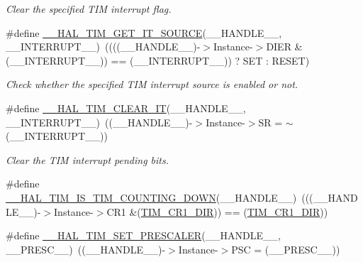 \begin{DoxyCompactItemize}
\begin{DoxyCompactList}\small\item\em Clear the specified T\+IM interrupt flag. \end{DoxyCompactList}\item 
\#define \mbox{\hyperlink{group___t_i_m___exported___macros_ga644babf93470a6eee6bce8906c4da5c5}{\+\_\+\+\_\+\+H\+A\+L\+\_\+\+T\+I\+M\+\_\+\+G\+E\+T\+\_\+\+I\+T\+\_\+\+S\+O\+U\+R\+CE}}(\+\_\+\+\_\+\+H\+A\+N\+D\+L\+E\+\_\+\+\_\+,  \+\_\+\+\_\+\+I\+N\+T\+E\+R\+R\+U\+P\+T\+\_\+\+\_\+)~((((\+\_\+\+\_\+\+H\+A\+N\+D\+L\+E\+\_\+\+\_\+)-\/$>$Instance-\/$>$D\+I\+ER \& (\+\_\+\+\_\+\+I\+N\+T\+E\+R\+R\+U\+P\+T\+\_\+\+\_\+)) == (\+\_\+\+\_\+\+I\+N\+T\+E\+R\+R\+U\+P\+T\+\_\+\+\_\+)) ? S\+ET \+: R\+E\+S\+ET)
\begin{DoxyCompactList}\small\item\em Check whether the specified T\+IM interrupt source is enabled or not. \end{DoxyCompactList}\item 
\#define \mbox{\hyperlink{group___t_i_m___exported___macros_gaea68155ce77e591e0c2582def061d6f0}{\+\_\+\+\_\+\+H\+A\+L\+\_\+\+T\+I\+M\+\_\+\+C\+L\+E\+A\+R\+\_\+\+IT}}(\+\_\+\+\_\+\+H\+A\+N\+D\+L\+E\+\_\+\+\_\+,  \+\_\+\+\_\+\+I\+N\+T\+E\+R\+R\+U\+P\+T\+\_\+\+\_\+)~((\+\_\+\+\_\+\+H\+A\+N\+D\+L\+E\+\_\+\+\_\+)-\/$>$Instance-\/$>$SR = $\sim$(\+\_\+\+\_\+\+I\+N\+T\+E\+R\+R\+U\+P\+T\+\_\+\+\_\+))
\begin{DoxyCompactList}\small\item\em Clear the T\+IM interrupt pending bits. \end{DoxyCompactList}\item 
\#define \mbox{\hyperlink{group___t_i_m___exported___macros_gac73f5e7669d92971830481e7298e98ba}{\+\_\+\+\_\+\+H\+A\+L\+\_\+\+T\+I\+M\+\_\+\+I\+S\+\_\+\+T\+I\+M\+\_\+\+C\+O\+U\+N\+T\+I\+N\+G\+\_\+\+D\+O\+WN}}(\+\_\+\+\_\+\+H\+A\+N\+D\+L\+E\+\_\+\+\_\+)~(((\+\_\+\+\_\+\+H\+A\+N\+D\+L\+E\+\_\+\+\_\+)-\/$>$Instance-\/$>$C\+R1 \&(\mbox{\hyperlink{group___peripheral___registers___bits___definition_gacea10770904af189f3aaeb97b45722aa}{T\+I\+M\+\_\+\+C\+R1\+\_\+\+D\+IR}})) == (\mbox{\hyperlink{group___peripheral___registers___bits___definition_gacea10770904af189f3aaeb97b45722aa}{T\+I\+M\+\_\+\+C\+R1\+\_\+\+D\+IR}}))
\item 
\#define \mbox{\hyperlink{group___t_i_m___exported___macros_gafdc5a06eab07e0c24e729fd492bdb27c}{\+\_\+\+\_\+\+H\+A\+L\+\_\+\+T\+I\+M\+\_\+\+S\+E\+T\+\_\+\+P\+R\+E\+S\+C\+A\+L\+ER}}(\+\_\+\+\_\+\+H\+A\+N\+D\+L\+E\+\_\+\+\_\+,  \+\_\+\+\_\+\+P\+R\+E\+S\+C\+\_\+\+\_\+)~((\+\_\+\+\_\+\+H\+A\+N\+D\+L\+E\+\_\+\+\_\+)-\/$>$Instance-\/$>$P\+SC = (\+\_\+\+\_\+\+P\+R\+E\+S\+C\+\_\+\+\_\+))

\end{DoxyCompactItemize}
